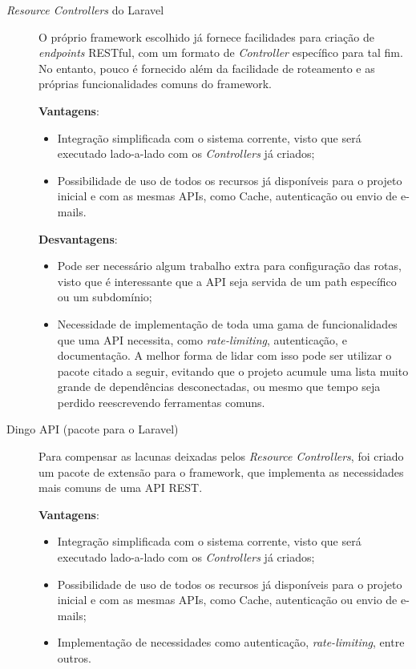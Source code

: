 \documentclass[12pt,a4paper,twoside,hyphens,english,brazil]{abntex2}
\begin{document}
{\begin{description}
	\item[\emph{Resource Controllers} do Laravel]
		O próprio framework escolhido já fornece facilidades para criação de \emph{endpoints} RESTful, com um formato de \emph{Controller} específico para tal fim. No entanto, pouco é fornecido além da facilidade de roteamento e as próprias funcionalidades comuns do framework.
		
		\textbf{Vantagens}:
		\begin{itemize}[itemsep=-1ex]
			\item Integração simplificada com o sistema corrente, visto que será executado lado-a-lado com os \emph{Controllers} já criados;
			\item Possibilidade de uso de todos os recursos já disponíveis para o projeto inicial e com as mesmas APIs, como Cache, autenticação ou envio de e-mails.
		\end{itemize}
			
		\textbf{Desvantagens}:
		\begin{itemize}[itemsep=-1ex]
			\item Pode ser necessário algum trabalho extra para configuração das rotas, visto que é interessante que a API seja servida de um path específico ou um subdomínio;
			\item Necessidade de implementação de toda uma gama de funcionalidades que uma API necessita, como \emph{rate-limiting}, autenticação, e documentação. A melhor forma de lidar com isso pode ser utilizar o pacote citado a seguir, evitando que o projeto acumule uma lista muito grande de dependências desconectadas, ou mesmo que tempo seja perdido reescrevendo ferramentas comuns.
		\end{itemize}
	
	\item[Dingo API (pacote para o Laravel)]
		Para compensar as lacunas deixadas pelos \emph{Resource Controllers}, foi criado um pacote de extensão para o framework, que implementa as necessidades mais comuns de uma API REST.
	
		\textbf{Vantagens}:
		\begin{itemize}[itemsep=-1ex]
			\item Integração simplificada com o sistema corrente, visto que será executado lado-a-lado com os \emph{Controllers} já criados;
			\item Possibilidade de uso de todos os recursos já disponíveis para o projeto inicial e com as mesmas APIs, como Cache, autenticação ou envio de e-mails;
			\item Implementação de necessidades como autenticação, \emph{rate-limiting}, entre outros.
		\end{itemize}
				

\end{description}}
\end{document}

